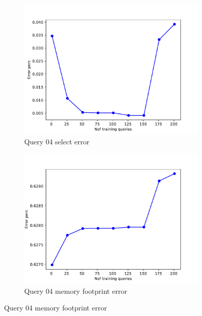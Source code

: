 \begin{figure}[!htb]
   \begin{subfigure}[t]{0.5\textwidth}
     \includegraphics[scale=0.4]{figs/tpch10/tpch10_sel04_error.pdf}
     \caption{Query 04 select error}
     \label{fig:tpch_sel04}
    \end{subfigure}
    \begin{subfigure}[t]{0.5\textwidth}
      \includegraphics[scale=0.4]{figs/tpch10/tpch10_q04_memerror.pdf}
      \caption{Query 04 memory footprint error}
      \label{fig:tpch_mem04}
    \end{subfigure}
\end{figure}

